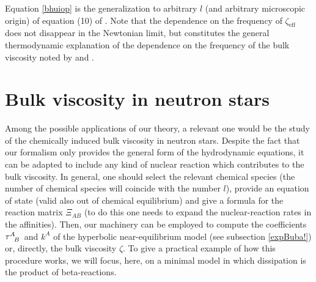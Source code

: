 \documentclass[useAMS,usenatbib,prd,twocolumn,nofootinbib]{revtex4-1}
\begin{document}
Equation \eqref{bhuiop} is the generalization to arbitrary $l$ (and arbitrary microscopic origin) of equation (10) of \citet{Sawyer_Bulk1989}. Note that the dependence on the frequency of $\zeta_{\textrm{eff}}$ does not disappear in the Newtonian limit, but constitutes the general thermodynamic explanation of the dependence on the frequency of the bulk viscosity noted by \citet{landau6} and \citet{Meador1996}.




\section{Bulk viscosity in neutron stars}\label{InNS}



Among the possible applications of our theory, a relevant one would be the study of the chemically induced bulk viscosity in neutron stars. Despite the fact that our formalism only provides the general form of the hydrodynamic equations, it can be adapted to include any kind of nuclear reaction which contributes to the bulk viscosity. In general, one should select the relevant chemical species (the number of chemical species will coincide with the number $l$), provide an equation of state (valid also out of chemical equilibrium) and give a formula for the reaction matrix $\Xi_{AB}$ (to do this one needs to expand the nuclear-reaction rates in the affinities).  Then, our machinery can be employed to compute the coefficients $\tau\indices{^A _B}$ and $k^A$ of the hyperbolic near-equilibrium model (see subsection \ref{expBuba!}) or, directly, the bulk viscosity $\zeta$. To give a practical example of how this procedure works, we will focus, here, on a minimal model in which dissipation is the product of beta-reactions.
\end{document}
